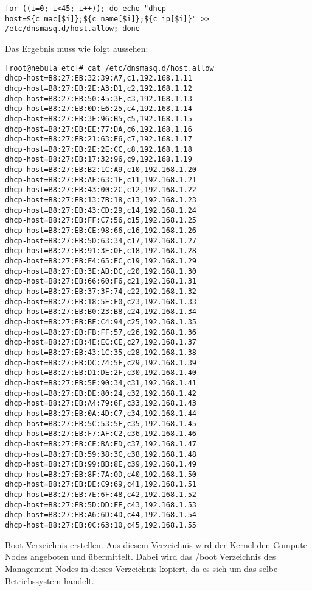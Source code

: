\begin{lstlisting}
for ((i=0; i<45; i++)); do echo "dhcp-host=${c_mac[$i]};${c_name[$i]};${c_ip[$i]}" >> /etc/dnsmasq.d/host.allow; done
\end{lstlisting}

Das Ergebnis muss wie folgt aussehen:
\begin{lstlisting}
[root@nebula etc]# cat /etc/dnsmasq.d/host.allow
dhcp-host=B8:27:EB:32:39:A7,c1,192.168.1.11
dhcp-host=B8:27:EB:2E:A3:D1,c2,192.168.1.12
dhcp-host=B8:27:EB:50:45:3F,c3,192.168.1.13
dhcp-host=B8:27:EB:0D:E6:25,c4,192.168.1.14
dhcp-host=B8:27:EB:3E:96:B5,c5,192.168.1.15
dhcp-host=B8:27:EB:EE:77:DA,c6,192.168.1.16
dhcp-host=B8:27:EB:21:63:E6,c7,192.168.1.17
dhcp-host=B8:27:EB:2E:2E:CC,c8,192.168.1.18
dhcp-host=B8:27:EB:17:32:96,c9,192.168.1.19
dhcp-host=B8:27:EB:B2:1C:A9,c10,192.168.1.20
dhcp-host=B8:27:EB:AF:63:1F,c11,192.168.1.21
dhcp-host=B8:27:EB:43:00:2C,c12,192.168.1.22
dhcp-host=B8:27:EB:13:7B:18,c13,192.168.1.23
dhcp-host=B8:27:EB:43:CD:29,c14,192.168.1.24
dhcp-host=B8:27:EB:FF:C7:56,c15,192.168.1.25
dhcp-host=B8:27:EB:CE:98:66,c16,192.168.1.26
dhcp-host=B8:27:EB:5D:63:34,c17,192.168.1.27
dhcp-host=B8:27:EB:91:3E:0F,c18,192.168.1.28
dhcp-host=B8:27:EB:F4:65:EC,c19,192.168.1.29
dhcp-host=B8:27:EB:3E:AB:DC,c20,192.168.1.30
dhcp-host=B8:27:EB:66:60:F6,c21,192.168.1.31
dhcp-host=B8:27:EB:37:3F:74,c22,192.168.1.32
dhcp-host=B8:27:EB:18:5E:F0,c23,192.168.1.33
dhcp-host=B8:27:EB:B0:23:B8,c24,192.168.1.34
dhcp-host=B8:27:EB:BE:C4:94,c25,192.168.1.35
dhcp-host=B8:27:EB:FB:FF:57,c26,192.168.1.36
dhcp-host=B8:27:EB:4E:EC:CE,c27,192.168.1.37
dhcp-host=B8:27:EB:43:1C:35,c28,192.168.1.38
dhcp-host=B8:27:EB:DC:74:5F,c29,192.168.1.39
dhcp-host=B8:27:EB:D1:DE:2F,c30,192.168.1.40
dhcp-host=B8:27:EB:5E:90:34,c31,192.168.1.41
dhcp-host=B8:27:EB:DE:80:24,c32,192.168.1.42
dhcp-host=B8:27:EB:A4:79:6F,c33,192.168.1.43
dhcp-host=B8:27:EB:0A:4D:C7,c34,192.168.1.44
dhcp-host=B8:27:EB:5C:53:5F,c35,192.168.1.45
dhcp-host=B8:27:EB:F7:AF:C2,c36,192.168.1.46
dhcp-host=B8:27:EB:CE:BA:ED,c37,192.168.1.47
dhcp-host=B8:27:EB:59:38:3C,c38,192.168.1.48
dhcp-host=B8:27:EB:99:BB:8E,c39,192.168.1.49
dhcp-host=B8:27:EB:8F:7A:0D,c40,192.168.1.50
dhcp-host=B8:27:EB:DE:C9:69,c41,192.168.1.51
dhcp-host=B8:27:EB:7E:6F:48,c42,192.168.1.52
dhcp-host=B8:27:EB:5D:DD:FE,c43,192.168.1.53
dhcp-host=B8:27:EB:A6:6D:4D,c44,192.168.1.54
dhcp-host=B8:27:EB:0C:63:10,c45,192.168.1.55
\end{lstlisting}

Boot-Verzeichnis erstellen. Aus diesem Verzeichnis wird der Kernel den Compute Nodes angeboten und übermittelt. Dabei wird das /boot Verzeichnis des Management Nodes in dieses Verzeichnis kopiert, da es sich um das selbe Betriebssystem handelt.

